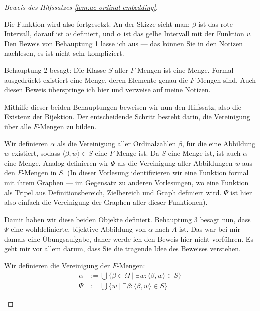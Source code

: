 \begin{proof}[Beweis des Hilfssatzes \ref{lem:ac-ordinal-embedding}]
\begin{spoken-clean}[01:08:09 - 01:10:21]
Die Funktion wird also fortgesetzt. An der Skizze sieht man: $\beta$ ist das rote Intervall, darauf ist $w$ definiert, und $\alpha$ ist das gelbe Intervall mit der Funktion $v$. Den Beweis von Behauptung 1 lasse ich aus --- das können Sie in den Notizen nachlesen, es ist nicht sehr kompliziert.

Behauptung 2 besagt: Die Klasse $S$ aller $F$-Mengen ist eine Menge. Formal ausgedrückt existiert eine Menge, deren Elemente genau die $F$-Mengen sind. Auch diesen Beweis überspringe ich hier und verweise auf meine Notizen.

Mithilfe dieser beiden Behauptungen beweisen wir nun den Hilfssatz, also die Existenz der Bijektion. Der entscheidende Schritt besteht darin, die Vereinigung über alle $F$-Mengen zu bilden.

Wir definieren $\alpha$ als die Vereinigung aller Ordinalzahlen $\beta$, für die eine Abbildung $w$ existiert, sodass $\langle \beta, w \rangle \in S$ eine $F$-Menge ist. Da $S$ eine Menge ist, ist auch $\alpha$ eine Menge. Analog definieren wir $\Psi$ als die Vereinigung aller Abbildungen $w$ aus den $F$-Mengen in $S$. (In dieser Vorlesung identifizieren wir eine Funktion formal mit ihrem Graphen --- im Gegensatz zu anderen Vorlesungen, wo eine Funktion als Tripel aus Definitionsbereich, Zielbereich und Graph definiert wird. $\Psi$ ist hier also einfach die Vereinigung der Graphen aller dieser Funktionen).

Damit haben wir diese beiden Objekte definiert. Behauptung 3 besagt nun, dass $\Psi$ eine wohldefinierte, bijektive Abbildung von $\alpha$ nach $A$ ist. Das war bei mir damals eine Übungsaufgabe, daher werde ich den Beweis hier nicht vorführen. Es geht mir vor allem darum, dass Sie die tragende Idee des Beweises verstehen.
\end{spoken-clean}

\begin{math-stroke}

Wir definieren die Vereinigung der $F$-Mengen:
\begin{align}
\alpha &:= \bigcup \bigl\{ \beta \in \Omega \;\big|\; \exists w \colon \langle \beta, w \rangle \in S \bigr\} \label{eq:union-ordinals} \\
\Psi &:= \bigcup \bigl\{ w \;\big|\; \exists \beta \colon \langle \beta, w \rangle \in S \bigr\} \label{eq:union-graphs}
\end{align}
\end{math-stroke}


\end{proof}
